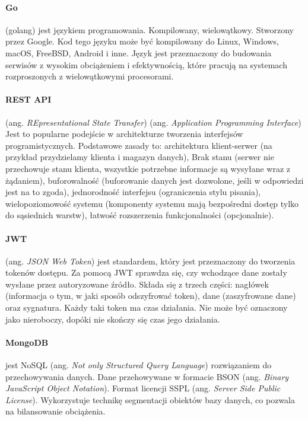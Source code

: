 \paragraph{Go} (golang) \cite{golang1,golang2,golang3,godoc} jest językiem programowania. Kompilowany, wielowątkowy. Stworzony przez Google. Kod tego języku może być kompilowany do Linux, Windows, macOS, FreeBSD, Android i inne.
Język jest przeznaczony do budowania serwisów z wysokim obciążeniem i efektywnością, które pracują na systemach rozproszonych z wielowątkowymi procesorami.

\paragraph{REST API} (ang. \textit{REpresentational State Transfer}) (ang. \textit{Application Programming Interface}) \cite{rest_api,rest_api_best} Jest to popularne podejście w architekturze tworzenia interfejsów programistycznych.
Podstawowe zasady to: architektura klient-serwer (na przykład przydzielamy klienta i magazyn danych), Brak stanu (serwer nie przechowuje stanu klienta, wszystkie potrzebne informacje są wysyłane wraz z żądaniem),
buforowalność (buforowanie danych jest dozwolone, jeśli w odpowiedzi jest na to zgoda), jednorodność interfejsu (ograniczenia stylu pisania), wielopoziomowość systemu (komponenty systemu mają bezpośredni dostęp tylko do sąsiednich warstw), łatwość rozszerzenia funkcjonalności (opcjonalnie).

\paragraph{JWT} (ang. \textit{JSON Web Token}) \cite{jwt} jest standardem, który jest przeznaczony do tworzenia tokenów dostępu. Za pomocą JWT sprawdza się, czy wchodzące dane zostały wysłane przez autoryzowane źródło.
Składa się z trzech części: nagłówek (informacja o tym, w jaki sposób odszyfrować token), dane (zaszyfrowane dane) oraz sygnatura. Każdy taki token ma czas działania. Nie może być oznaczony jako nieroboczy, dopóki nie skończy się czas jego działania.

\paragraph{MongoDB} \cite{mongoDB,mongoDB_doc,mongodb_habr} jest NoSQL (ang. \textit{Not only Structured Query Language}) rozwiązaniem do przechowywania danych. Dane przehowywane w formacie BSON (ang. \textit{Binary JavaScript Object Notation}).
Format licencji SSPL (ang. \textit{Server Side Public License}). Wykorzystuje technikę segmentacji obiektów bazy danych, co pozwala na bilansowanie obciążenia.

